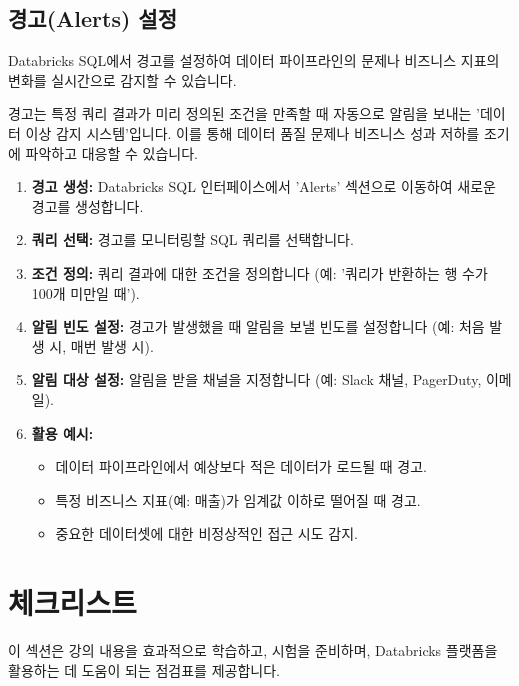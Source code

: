 \documentclass[11pt,a4paper]{article}
\theoremstyle{definition}
\begin{document}
\subsection{경고(Alerts) 설정}
Databricks SQL에서 경고를 설정하여 데이터 파이프라인의 문제나 비즈니스 지표의 변화를 실시간으로 감지할 수 있습니다.

\begin{summarybox}[title=핵심 요약: 데이터 이상 감지 시스템]
경고는 특정 쿼리 결과가 미리 정의된 조건을 만족할 때 자동으로 알림을 보내는 '데이터 이상 감지 시스템'입니다. 이를 통해 데이터 품질 문제나 비즈니스 성과 저하를 조기에 파악하고 대응할 수 있습니다.
\end{summarybox}

\begin{enumerate}
    \item \textbf{경고 생성:} Databricks SQL 인터페이스에서 'Alerts' 섹션으로 이동하여 새로운 경고를 생성합니다.
    \item \textbf{쿼리 선택:} 경고를 모니터링할 SQL 쿼리를 선택합니다.
    \item \textbf{조건 정의:} 쿼리 결과에 대한 조건을 정의합니다 (예: '쿼리가 반환하는 행 수가 100개 미만일 때').
    \item \textbf{알림 빈도 설정:} 경고가 발생했을 때 알림을 보낼 빈도를 설정합니다 (예: 처음 발생 시, 매번 발생 시).
    \item \textbf{알림 대상 설정:} 알림을 받을 채널을 지정합니다 (예: Slack 채널, PagerDuty, 이메일).
    \item \textbf{활용 예시:}
    \begin{itemize}
        \item 데이터 파이프라인에서 예상보다 적은 데이터가 로드될 때 경고.
        \item 특정 비즈니스 지표(예: 매출)가 임계값 이하로 떨어질 때 경고.
        \item 중요한 데이터셋에 대한 비정상적인 접근 시도 감지.
    \end{itemize}
\end{enumerate}

\newpage
\section{체크리스트}

이 섹션은 강의 내용을 효과적으로 학습하고, 시험을 준비하며, Databricks 플랫폼을 활용하는 데 도움이 되는 점검표를 제공합니다.
\end{document}
